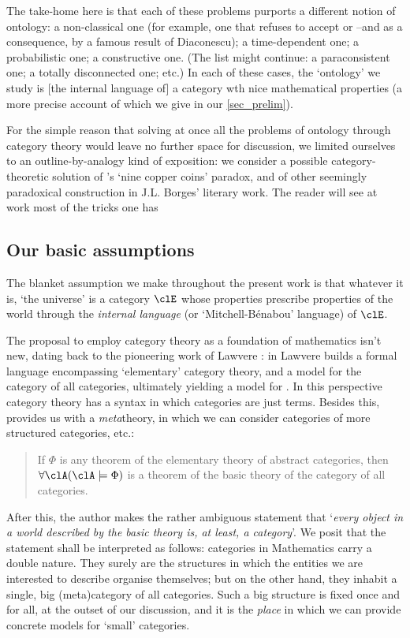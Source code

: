 The take-home here is that each of these problems purports a different notion of ontology: a non-classical one (for example, one that refuses to accept  or  --and  as a consequence, by a famous result of Diaconescu); a time-dependent one; a probabilistic one; a constructive one. (The list might continue: a paraconsistent one; a totally disconnected one; etc.)
In each of these cases, the `ontology' we study is [the internal language of] a category wth nice mathematical properties (a more precise account of which we give in our \autoref{sec_prelim}).

For the simple reason that solving at once all the problems of ontology through category theory would leave no further space for discussion, we limited ourselves to an outline-by-analogy kind of exposition: we consider a possible category-theoretic solution of \tlon's `nine copper coins' paradox, and of other seemingly paradoxical construction in J.L. Borges' literary work. The reader will see at work most of the tricks one has 


\subsection{Our basic assumptions}

The blanket assumption we make throughout the present work is that whatever it is, `the universe' is a category $\clE$ whose properties prescribe properties of the world through the \emph{internal language} (or `Mitchell-Bénabou' language) of $\clE$. 

The proposal to employ category theory as a foundation of mathematics isn't new, dating back to the pioneering work of Lawvere \cite{lawvere1964elementary,lajolla,lawvere1969adjointness,lawvere1963functorial}: in \cite{lajolla} Lawvere builds a formal language  encompassing `elementary' category theory, and a model  for the category of all categories, ultimately yielding a model for . In this perspective category theory has a syntax in which categories are just terms. Besides this,  provides us with a \emph{meta}theory, in which we can consider categories of more structured categories, etc.:
\begin{quote}
	If $\Phi$ is any theorem of the elementary theory of abstract categories, then $\forall \clA (\clA \models \Phi)$ is a theorem of the basic theory of the category of all categories. \hfill \cite{lajolla}
\end{quote}
After this, the author makes the rather ambiguous statement that `\textit{every object in a world described by the basic theory is, at least, a category}'. We posit that the statement shall be interpreted as follows: categories in Mathematics carry a double nature. They surely are the structures in which the entities we are interested to describe organise themselves; but on the other hand, they inhabit a single, big (meta)category of all categories. Such a big structure is fixed once and for all, at the outset of our discussion, and it is the \emph{place} in which we can provide concrete models for `small' categories.

